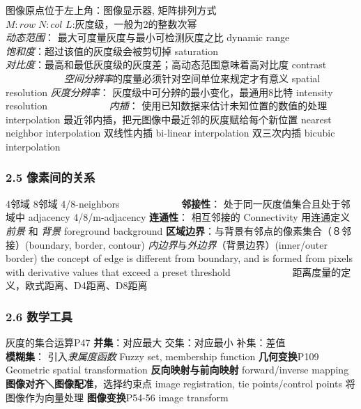 \documentclass[]{article}
\begin{document}
 图像原点位于左上角：图像显示器, 矩阵排列方式\\

 \(M:row\; N:col\) \(L\):灰度级，一般为2的整数次幂\\
 \emph{动态范围}： 最大可度量灰度与最小可检测灰度之比 dynamic range\\
 \emph{饱和度}：超过该值的灰度级会被剪切掉 saturation\\
 \emph{对比度}：最高和最低灰度级的灰度差；高动态范围意味着高对比度
contrast\\

\(\qquad\)\(\qquad\)\(\qquad\)\emph{空间分辨率}的度量必须针对空间单位来规定才有意义
spatial resolution \emph{灰度分辨率}：
灰度级中可分辨的最小变化，最通用8比特 intensity resolution
\(\qquad\)\(\qquad\)\(\qquad\)\emph{内插}：
使用已知数据来估计未知位置的数值的处理 interpolation
最近邻内插，把元图像中最近邻的灰度赋给每个新位置 nearest neighbor
interpolation 双线性内插 bi-linear interpolation 双三次内插 bicubic
interpolation

\subsubsection{2.5 像素间的关系}\label{header-n86}

 4邻域 8邻域 4/8-neighbors
\(\qquad\)\(\qquad\)\(\qquad\)\textbf{邻接性}：
处于同一灰度值集合且处于邻域中 adjacency 4/8/m-adjacency
\textbf{连通性}： 相互邻接的 Connectivity 用连通定义 \emph{前景} 和
\emph{背景} foreground background
\textbf{区域边界}：与背景有邻点的像素集合（８邻接）(boundary, border,
contour) \emph{内边界}与\emph{外边界}（背景边界）(inner/outer border)
the concept of edge is different from boundary, and is formed from
pixels with derivative values that exceed a preset threshold
\(\qquad\)\(\qquad\)\(\qquad\)距离度量的定义，欧式距离、D4距离、D8距离

\subsubsection{2.6 数学工具}\label{header-n99}

 灰度的集合运算P47 \textbf{并集}：对应最大 交集：对应最小 补集：差值
\(\qquad\)\(\qquad\)\(\qquad\)\textbf{模糊集}： 引入\emph{隶属度函数}
Fuzzy set, membership function \textbf{几何变换}P109 Geometric spatial
transformation \textbf{反向映射与前向映射} forward/inverse mapping
\textbf{图像对齐＼图像配准}，选择约束点 image registration, tie
points/control points 将图像作为向量处理 \textbf{图像变换}P54-56 image
transform
\end{document}
